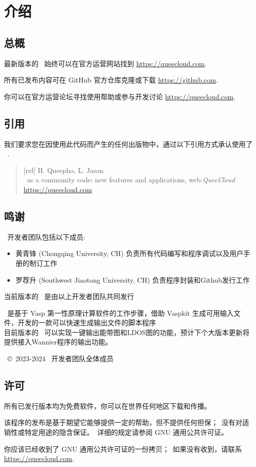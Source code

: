\chapter*{介绍}
\section*{总概}
最新版本的 \Quee\ 始终可以在官方运营网站找到 \url{https://queecloud.com}.

所有已发布内容可在 GitHub 官方仓库克隆或下载 \url{https://github.com}.

你可以在官方运营论坛寻找使用帮助或参与开发讨论 \url{https://queecloud.com}.

\section*{引用}
我们要求您在因使用此代码而产生的任何出版物中，通过以下引用方式承认使用了 \Quee\ .
\begin{quote}
  [ref] H. Queepho, L. Jason\\
  \Quee\ as a community code: new features and 
    applications, web:\emph{QueeCloud} \\
    \url{https://queecloud.com}
  \end{quote}                                                   

\section*{鸣谢}
\Quee\ 开发者团队包括以下成员:\\
\begin{itemize}
  \item 黄青锋 (Chongqing University, CH) 负责所有代码编写和程序调试以及用户手册的制订工作\\
  \item 罗荐升 (Southwest Jiaotong University, CH) 负责程序封装和Github发行工作
\end{itemize}
当前版本的 \Quee\ 是由以上开发者团队共同发行

\Quee\ 是基于 Vasp 第一性原理计算软件的工作步骤，借助 Vaspkit 生成可用输入文件，开发的一款可以快速生成输出文件的脚本程序\\
目前版本的 \Quee\ 可以实现一键输出能带图和LDOS图的功能，预计下个大版本更新将提供接入Wannier程序的输出功能。

\Quee\ \copyright\ 2023-2024 \Quee\ 开发者团队全体成员

\section*{许可}
所有已发行版本均为免费软件，你可以在世界任何地区下载和传播。

该程序的发布是基于期望它能够提供一定的帮助，但不提供任何担保；\
没有对适销性或特定用途的隐含保证。\
详细的规定请参阅 GNU 通用公共许可证。

你应该已经收到了 GNU 通用公共许可证的一份拷贝；\
如果没有收到，请联系\\
\url{https://queecloud.com}.


 
